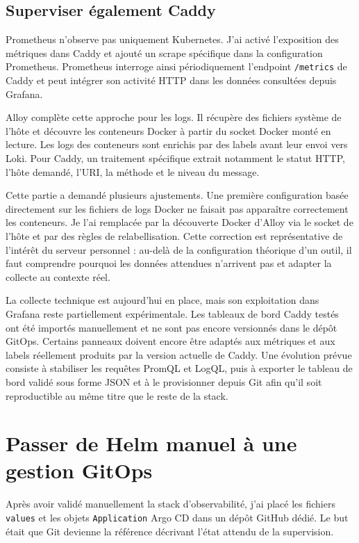 \subsection{Superviser également Caddy}

Prometheus n'observe pas uniquement Kubernetes. J'ai activé l'exposition des métriques dans Caddy et ajouté un scrape spécifique dans la configuration Prometheus. Prometheus interroge ainsi périodiquement l'endpoint \texttt{/metrics} de Caddy et peut intégrer son activité HTTP dans les données consultées depuis Grafana.

Alloy complète cette approche pour les logs. Il récupère des fichiers système de l'hôte et découvre les conteneurs Docker à partir du socket Docker monté en lecture. Les logs des conteneurs sont enrichis par des labels avant leur envoi vers Loki. Pour Caddy, un traitement spécifique extrait notamment le statut HTTP, l'hôte demandé, l'URI, la méthode et le niveau du message.

Cette partie a demandé plusieurs ajustements. Une première configuration basée directement sur les fichiers de logs Docker ne faisait pas apparaître correctement les conteneurs. Je l'ai remplacée par la découverte Docker d'Alloy via le socket de l'hôte et par des règles de relabellisation. Cette correction est représentative de l'intérêt du serveur personnel : au-delà de la configuration théorique d'un outil, il faut comprendre pourquoi les données attendues n'arrivent pas et adapter la collecte au contexte réel.

La collecte technique est aujourd'hui en place, mais son exploitation dans Grafana reste partiellement expérimentale. Les tableaux de bord Caddy testés ont été importés manuellement et ne sont pas encore versionnés dans le dépôt GitOps. Certains panneaux doivent encore être adaptés aux métriques et aux labels réellement produits par la version actuelle de Caddy. Une évolution prévue consiste à stabiliser les requêtes PromQL et LogQL, puis à exporter le tableau de bord validé sous forme JSON et à le provisionner depuis Git afin qu'il soit reproductible au même titre que le reste de la stack.

\section{Passer de Helm manuel à une gestion GitOps}

Après avoir validé manuellement la stack d'observabilité, j'ai placé les fichiers \texttt{values} et les objets \texttt{Application} Argo CD dans un dépôt GitHub dédié. Le but était que Git devienne la référence décrivant l'état attendu de la supervision.

